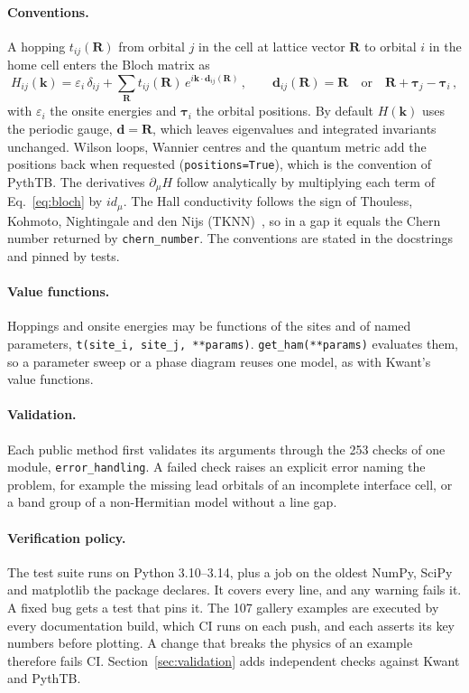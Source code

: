 \documentclass[submission, Phys]{SciPost}
\newcommand{\code}[1]{\texttt{#1}}
\begin{document}
\paragraph{Conventions.} A hopping $t_{ij}(\mathbf{R})$ from orbital $j$
in the cell at lattice vector $\mathbf{R}$ to orbital $i$ in the home cell
enters the Bloch matrix as
\begin{equation}
H_{ij}(\mathbf{k}) = \varepsilon_i\,\delta_{ij}
  + \sum_{\mathbf{R}} t_{ij}(\mathbf{R})\, e^{i\mathbf{k}\cdot\mathbf{d}_{ij}(\mathbf{R})}\,,
\qquad
\mathbf{d}_{ij}(\mathbf{R}) = \mathbf{R}
\quad\text{or}\quad
\mathbf{R} + \boldsymbol{\tau}_j - \boldsymbol{\tau}_i\,,
\label{eq:bloch}
\end{equation}
with $\varepsilon_i$ the onsite energies and $\boldsymbol{\tau}_i$ the
orbital positions. By default $H(\mathbf{k})$ uses the periodic gauge,
$\mathbf{d} = \mathbf{R}$, which leaves eigenvalues and integrated
invariants unchanged. Wilson loops, Wannier centres and the quantum metric
add the positions back when requested (\code{positions=True}), which is
the convention of PythTB. The derivatives $\partial_\mu H$ follow
analytically by multiplying each term of Eq.~\eqref{eq:bloch} by
$i d_\mu$. The Hall conductivity follows the sign of Thouless,
Kohmoto, Nightingale and den Nijs (TKNN)~\cite{tknn1982}, so in a gap
it equals the Chern number returned by \code{chern\_number}. The
conventions are stated in the docstrings and pinned by tests.

\paragraph{Value functions.} Hoppings and onsite energies may be functions
of the sites and of named parameters, \code{t(site\_i, site\_j, **params)}.
\code{get\_ham(**params)} evaluates them, so a parameter sweep or a phase
diagram reuses one model, as with Kwant's value functions.

\paragraph{Validation.} Each public method first validates its arguments
through the 253 checks of one module, \code{error\_handling}. A failed
check raises an explicit error naming the problem, for example
the missing lead orbitals of an incomplete interface cell, or a band group of
a non-Hermitian model without a line gap.

\paragraph{Verification policy.} The test suite runs on Python 3.10--3.14,
plus a job on the oldest NumPy, SciPy and matplotlib the package declares.
It covers every line, and any warning fails it. A fixed bug gets a test
that pins it. The 107 gallery examples are executed by every documentation
build, which CI runs on each push, and each asserts its key numbers before
plotting. A change that breaks the physics of an example therefore fails
CI. Section~\ref{sec:validation} adds independent checks against Kwant and
PythTB.
\end{document}
